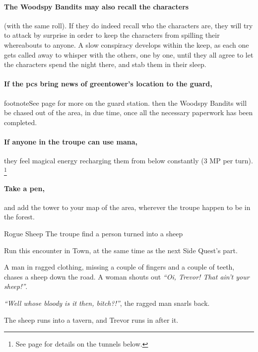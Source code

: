 \paragraph{The Woodspy Bandits may also recall the characters}
(with the same roll).
If they do indeed recall who the characters are, they will try to attack by surprise in order to keep the characters from spilling their whereabouts to anyone.
A slow conspiracy develops within the keep, as each one gets called away to whisper with the others, one by one, until they all agree to let the characters spend the night there, and stab them in their sleep.

\paragraph{If the \glspl{pc} bring news of \gls{greentower}'s location to the \gls{guard},}
footnote{See page \pageref{guardstation} for more on the guard station.}
then the Woodspy Bandits will be chased out of the area, in due time, once all the necessary paperwork has been completed.

\paragraph{If anyone in the troupe can use mana,}
they feel magical energy recharging them from below constantly (3 MP per turn).%
\footnote{See page \pageref{underGreenTower} for details on the tunnels below.}

\paragraph{Take a pen,}
and add the tower to your map of the area, wherever the troupe happen to be in the forest.

{\squash Rogue Sheep}%
{The troupe find a person turned into a sheep}%

Run this encounter in Town, at the same time as the next Side Quest's part.

\begin{boxtext}

  A man in ragged clothing, missing a couple of fingers and a couple of teeth, chases a sheep down the road.  A woman shouts out \emph{``Oi, Trevor! That ain't your sheep!''}.

  \emph{``Well whose bloody is it then, bitch?!''}, the ragged man snarls back.

  The sheep runs into a tavern, and Trevor runs in after it.

\end{boxtext}

